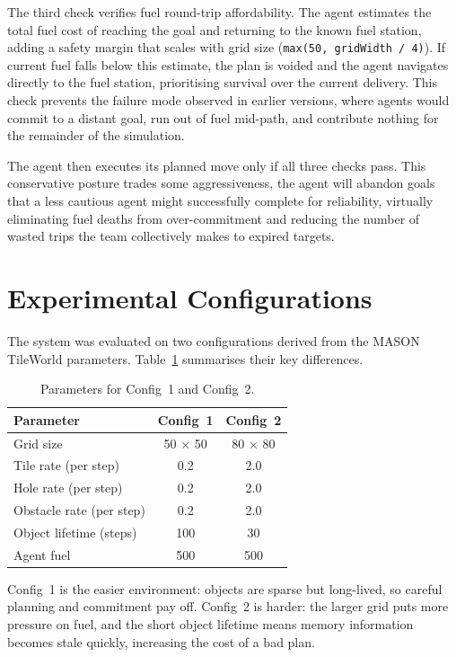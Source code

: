 \documentclass[letterpaper]{article}
\begin{document}
The third check verifies fuel round-trip affordability. The agent estimates the
total fuel cost of reaching the goal and returning to the known fuel station,
adding a safety margin that scales with grid size (\texttt{max(50, gridWidth /
4)}). If current fuel falls below this estimate, the plan is voided and the
agent navigates directly to the fuel station, prioritising survival over the
current delivery. This check prevents the failure mode observed in earlier
versions, where agents would commit to a distant goal, run out of fuel mid-path,
and contribute nothing for the remainder of the simulation.

The agent then executes its planned move only if all three checks pass. This
conservative posture trades some aggressiveness, the agent will abandon goals
that a less cautious agent might successfully complete for reliability,
virtually eliminating fuel deaths from over-commitment and reducing the number
of wasted trips the team collectively makes to expired targets.

\section{Experimental Configurations}

The system was evaluated on two configurations derived from the MASON
TileWorld parameters. Table~\ref{tab:configs} summarises their key differences.

\begin{table}[t]
\centering
\small
\begin{tabular}{@{}lcc@{}}
\toprule
\textbf{Parameter} & \textbf{Config~1} & \textbf{Config~2} \\
\midrule
Grid size       & 50 $\times$ 50 & 80 $\times$ 80 \\
Tile rate (per step)     & 0.2  & 2.0 \\
Hole rate (per step)     & 0.2  & 2.0 \\
Obstacle rate (per step) & 0.2  & 2.0 \\
Object lifetime (steps)  & 100  & 30  \\
Agent fuel               & 500  & 500 \\
\bottomrule
\end{tabular}
\caption{Parameters for Config~1 and Config~2.}
\label{tab:configs}
\end{table}

Config~1 is the easier environment: objects are sparse but long-lived, so
careful planning and commitment pay off. Config~2 is harder: the larger grid
puts more pressure on fuel, and the short object lifetime means memory
information becomes stale quickly, increasing the cost of a bad plan.
\end{document}
